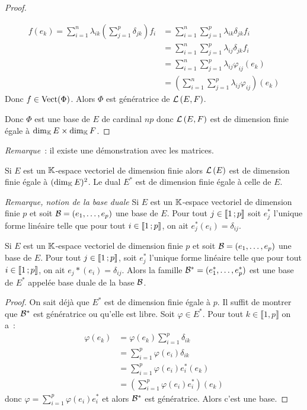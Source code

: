 \begin{proof}
\begin{enumerate}
      \begin{align}
        f(e_k) = \sum_{i=1}^n \lambda_{ik} \left(\sum_{j=1}^p \delta_{jk}\right) 
        f_i &= \sum_{i=1}^n \sum_{j=1}^p \lambda_{ik} \delta_{jk} f_i \\
        &=\sum_{i=1}^n \sum_{j=1}^p \lambda_{ij} \delta_{jk} f_i\\
        &=\sum_{i=1}^n \sum_{j=1}^p \lambda_{ij} \varphi_{ij}(e_k)\\
        &=\left(\sum_{i=1}^n \sum_{j=1}^p \lambda_{ij} \varphi_{ij}\right)(e_k)
      \end{align}
      Donc \(f \in \operatorname{Vect}(\Phi)\). Alors \(\Phi\) est génératrice de 
      \(\mathcal{L}\left(E,F\right)\).
  \end{enumerate}
  Donc \(\Phi\) est une base de \(E\) de cardinal \(np\) donc \(\mathcal{L}\left(E,F\right)\) est 
  de dimension finie égale à \(\operatorname{dim}_{\mathbb{K}} E \times \operatorname{dim}_{\mathbb{K}} F\).
\end{proof}

\emph{Remarque}~: il existe une démonstration avec les matrices.

\begin{corth}
  Si \(E\) est un \(\mathbb{K}\)-espace vectoriel de dimension finie alors \(\mathcal{L}\left(E\right)\) 
  est de dimension finie égale à \((\operatorname{dim}_{\mathbb{K}} E)^2\). Le dual \(E^*\) est de 
  dimension finie égale à celle de \(E\).
\end{corth}

\emph{Remarque, notion de la base duale} Si \(E\) est un \(\mathbb{K}\)-espace vectoriel 
de dimension finie \(p\) et soit \(\mathcal{B}=(e_1, \ldots, e_p)\) une base de \(E\). 
Pour tout \(j \in  \mathopen{\llbracket}1\mathclose{}\mathpunct{};p\mathclose{\rrbracket}\) soit \(e_j^*\) l'unique forme 
linéaire telle que pour tout \(i \in  \mathopen{\llbracket}1\mathclose{}\mathpunct{};p\mathclose{\rrbracket}\), on ait 
\(e_j^*(e_i)=\delta_{ij}\).

\begin{prop}
  Si \(E\) est un \(\mathbb{K}\)-espace vectoriel de dimension finie \(p\) et soit 
  \(\mathcal{B}=(e_1, \ldots, e_p)\) une base de \(E\). Pour tout \(j \in  
  \mathopen{\llbracket}1\mathclose{}\mathpunct{};p\mathclose{\rrbracket}\), soit \(e_j^*\) l'unique forme linéaire telle que 
  pour tout \(i \in  \mathopen{\llbracket}1\mathclose{}\mathpunct{};p\mathclose{\rrbracket}\), on ait 
  \(e_j*(e_i)=\delta_{ij}\). Alors la famille \(\mathcal{B}^* = (e_1^*, \ldots, e_p^*)\) 
  est une base de \(E^*\) appelée base duale de la base \(\mathcal{B}\).
\end{prop}
\begin{proof}
  On sait déjà que \(E^*\) est de dimension finie égale à \(p\). Il suffit de 
  montrer que \(\mathcal{B}^*\) est génératrice ou qu'elle est libre. Soit \(\varphi \in 
  E^*\). Pour tout \(k \in \llbracket 1,p \rrbracket\) on a~:
  \begin{align}
    \varphi(e_k)&= \varphi(e_k) \sum_{i=1}^p \delta_{ik} \\
    &= \sum_{i=1}^p \varphi(e_i) \delta_{ik} \\ &=\sum_{i=1}^p \varphi(e_i) 
    e_i^*(e_k)  \\
    &=\left(\sum_{i=1}^p \varphi(e_i) e_i^* \right)(e_k)
  \end{align}
  donc \(\varphi = \sum_{i=1}^p \varphi(e_i) e_i^*\) et alors \(\mathcal{B}^*\) est 
  génératrice. Alors c'est une base.
\end{proof}

